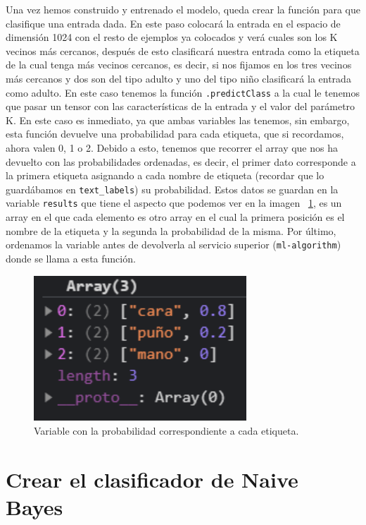 \documentclass[a4paper, 12pt]{book}
\begin{document}
Una vez hemos construido y entrenado el modelo, queda crear la función para que clasifique una entrada dada. En este paso colocará la entrada en el espacio de dimensión 1024 con el resto de ejemplos ya colocados y verá cuales son los K vecinos más cercanos, después de esto clasificará nuestra entrada como la etiqueta de la cual tenga más vecinos cercanos, es decir, si nos fijamos en los tres vecinos más cercanos y dos son del tipo adulto y uno del tipo niño clasificará la entrada como adulto. En este caso tenemos la función \texttt{.predictClass} a la cual le tenemos que pasar un tensor con las características de la entrada y el valor del parámetro K. En este caso es inmediato, ya que ambas variables las tenemos, sin embargo, esta función devuelve una probabilidad para cada etiqueta, que si recordamos, ahora valen 0, 1 o 2. Debido a esto, tenemos que recorrer el array que nos ha devuelto con las probabilidades ordenadas, es decir, el primer dato corresponde a la primera etiqueta asignando a cada nombre de etiqueta (recordar que lo guardábamos en \texttt{text\_labels}) su probabilidad. Estos datos se guardan en la variable \texttt{results} que tiene el aspecto que podemos ver en la imagen ~\ref{fig:resultsknn}, es un array en el que cada elemento es otro array en el cual la primera posición es el nombre de la etiqueta y la segunda la probabilidad de la misma. Por último, ordenamos la variable antes de devolverla al servicio superior (\texttt{ml-algorithm}) donde se llama a esta función.

\begin{figure}
	\centering
	\includegraphics[width=8cm, keepaspectratio]{img/resultsknn}
	\caption{Variable con la probabilidad correspondiente a cada etiqueta.}				
	\label{fig:resultsknn}
\end{figure}

\section{Crear el clasificador de Naive Bayes} 
\label{sec:naivebayes}
\end{document}
